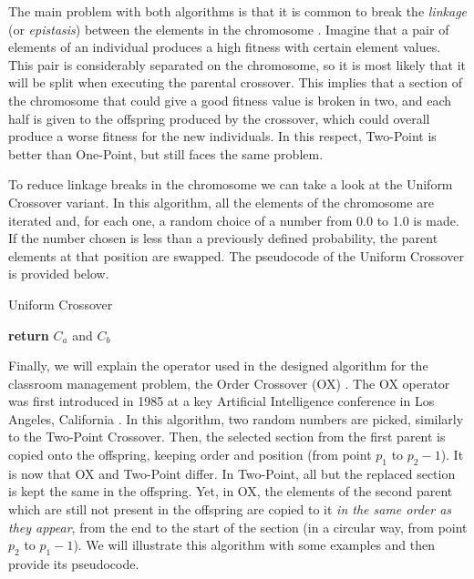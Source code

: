 The main problem with both algorithms is that it is common to break the \textit{linkage} (or \textit{epistasis}) between the elements in the chromosome \cite{luke13metaheuristics}. Imagine that a pair of elements of an individual produces a high fitness with certain element values. This pair is considerably separated on the chromosome, so it is most likely that it will be split when executing the parental crossover. This implies that a section of the chromosome that could give a good fitness value is broken in two, and each half is given to the offspring produced by the crossover, which could overall produce a worse fitness for the new individuals. In this respect, Two-Point is better than One-Point, but still faces the same problem. 

To reduce linkage breaks in the chromosome we can take a look at the Uniform Crossover variant. In this algorithm, all the elements of the chromosome are iterated and, for each one, a random choice of a number from 0.0 to 1.0 is made. If the number chosen is less than a previously defined probability, the parent elements at that position are swapped. The pseudocode of the Uniform Crossover is provided below.

\begin{algorithm}[H]
    \caption{Uniform Crossover}
    \begin{algorithmic}[1]
                \EndIf
            \EndFor
            \State \textbf{return} {$C_{a}$ and $C_{b}$}
        \EndProcedure
    \end{algorithmic}
\end{algorithm}

Finally, we will explain the operator used in the designed algorithm for the classroom management problem, the Order Crossover (OX) \cite{davis85ox}. The OX operator was first introduced in 1985 at a key Artificial Intelligence conference in Los Angeles, California \cite{joshi85ai}. In this algorithm, two random numbers are picked, similarly to the Two-Point Crossover. Then, the selected section from the first parent is copied onto the offspring, keeping order and position (from point $p_{1}$ to $p_{2}-1$). It is now that OX and Two-Point differ. In Two-Point, all but the replaced section is kept the same in the offspring. Yet, in OX, the elements of the second parent which are still not present in the offspring are copied to it \textit{in the same order as they appear}, from the end to the start of the section (in a circular way, from point $p_{2}$ to $p_{1}-1$). We will illustrate this algorithm with some examples and then provide its pseudocode. 

